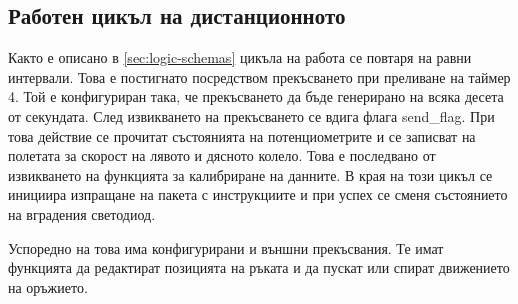 
\subsection{Работен цикъл на дистанционното}
\label{ssec:loop-controller}

Както е описано в \cref{sec:logic-schemas} цикъла на работа се повтаря на равни интервали. Това е постигнато посредством прекъсването при преливане на таймер 4. Той е конфигуриран така, че прекъсването да бъде генерирано на всяка десета от секундата. След извикването на прекъсването се вдига флага send\_flag. При това действие се прочитат състоянията на потенциометрите и се записват на полетата за скорост на лявото и дясното колело. Това е последвано от извикването на функцията за калибриране на данните. В края на този цикъл се инициира изпращане на пакета с инструкциите и при успех се сменя състоянието на вградения светодиод.



Успоредно на това има конфигурирани и външни прекъсвания. Те имат функцията да редактират позицията на ръката и да пускат или спират движението на оръжието.



